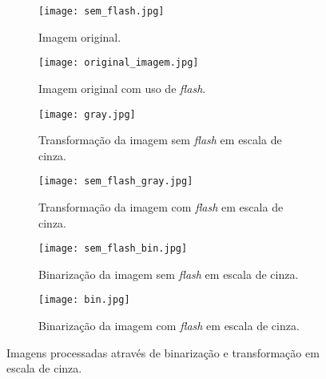 \begin{figure}
    \centering
     \begin{subfigure}{0.45\textwidth}
        \texttt{[image: sem\_flash.jpg]}
        \caption{Imagem original.}
          \label{imagens_processadas:a}
      \end{subfigure}
        \hfill
      \begin{subfigure}{0.45\textwidth}
        \texttt{[image: original\_imagem.jpg]}
        \caption{Imagem original com uso de \emph{flash}.}
          \label{imagens_processadas:b}
      \end{subfigure}
      \hfill
      \begin{subfigure}{0.45\textwidth}
        \texttt{[image: gray.jpg]}
        \caption{Transformação da imagem sem \emph{flash} em escala de cinza.}
          \label{imagens_processadas:c}
      \end{subfigure}
      \hfill
      \begin{subfigure}{0.45\textwidth}
        \texttt{[image: sem\_flash\_gray.jpg]}
        \caption{Transformação da imagem com \emph{flash} em escala de cinza.}
          \label{imagens_processadas:d}
      \end{subfigure}
      \hfill
      \begin{subfigure}{0.45\textwidth}
        \texttt{[image: sem\_flash\_bin.jpg]}
        \caption{Binarização da imagem sem \emph{flash} em escala de cinza.}
          \label{imagens_processadas:e}
      \end{subfigure}
      \hfill
      \begin{subfigure}{0.45\textwidth}
        \texttt{[image: bin.jpg]}
        \caption{Binarização da imagem com \emph{flash} em escala de cinza.}
          \label{imagens_processadas:f}
      \end{subfigure}
    \label{imagens_processadas}
    \caption{Imagens processadas através de binarização e transformação em escala de cinza.}
\end{figure}
